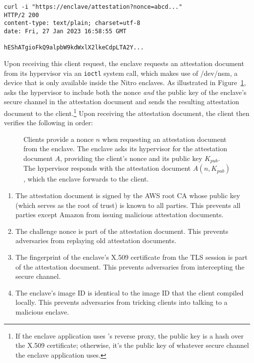 \begin{lstlisting}[numbers=none,basicstyle=\small\ttfamily]
curl -i "https://enclave/attestation?nonce=abcd..."
HTTP/2 200
content-type: text/plain; charset=utf-8
date: Fri, 27 Jan 2023 16:58:55 GMT

hEShATgioFkQ9alpbW9kdWxlX2lkeCdpLTA2Y...
\end{lstlisting}

Upon receiving this client request, the enclave requests an attestation document
from its hypervisor via an \texttt{ioctl} system call, which makes use of
/dev/nsm, a device that is only available inside the Nitro enclaves.  As
illustrated in Figure~\ref{fig:attestation}, \tool{} asks the hypervisor
to include both the nonce \emph{and} the public key of the enclave's secure
channel in the attestation document and sends the resulting attestation document
to the client.\footnote{If the enclave application uses \tool{}'s reverse proxy,
the public key is a hash over the X.509 certificate; otherwise, it's the public
key of whatever secure channel the enclave application uses.}  Upon receiving
the attestation document, the client then verifies the following in order:

\begin{figure}[t]
  \centering
  
  \caption{Clients provide a nonce $n$ when requesting an attestation document
  from the enclave.  The enclave asks its hypervisor for the attestation
  document $A$, providing the client's nonce and its public key $K_{pub}$.  The
  hypervisor responds with the attestation document $A(n, K_{pub})$, which the
  enclave forwards to the client.}
  \label{fig:attestation}
\end{figure}

\begin{enumerate}
  \item The attestation document is signed by the AWS root CA whose public key
    (which serves as the root of trust) is known to all parties.  This prevents
    all parties except Amazon from issuing malicious attestation documents.
  \item The challenge nonce is part of the attestation document.  This prevents
    adversaries from replaying old attestation documents.
  \item The fingerprint of the enclave's X.509 certificate from the TLS session
    is part of the attestation document.  This prevents adversaries from
    intercepting the secure channel.
  \item The enclave's image ID is identical to the image ID that the client
    compiled locally.  This prevents adversaries from tricking clients into
    talking to a malicious enclave.
\end{enumerate}

